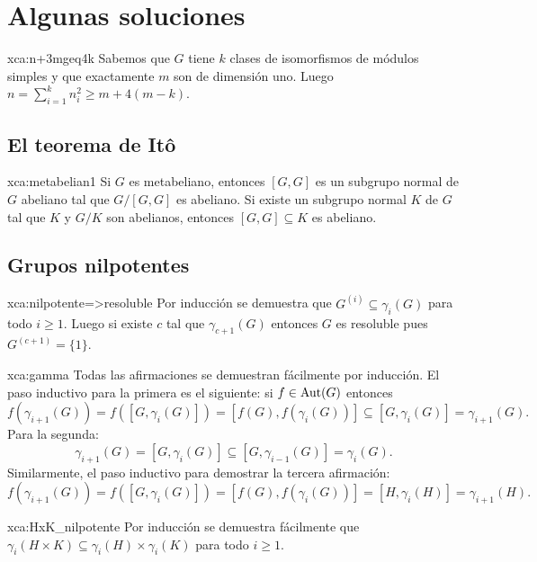 \chapter*{Algunas soluciones}

\begin{sol}{xca:n+3mgeq4k}
     Sabemos que $G$ tiene $k$ clases de isomorfismos de módulos simples y que exactamente 
     $m$ son de dimensión uno. Luego $n=\sum_{i=1}^kn_i^2\geq m+4(m-k)$. 
\end{sol}

\section*{El teorema de It\^o}

\begin{sol}{xca:metabelian1}
	Si $G$ es metabeliano, entonces $[G,G]$ es un subgrupo normal de $G$
	abeliano tal que $G/[G,G]$ es abeliano. Si existe un subgrupo normal $K$ de
	$G$ tal que $K$ y $G/K$ son abelianos, entonces $[G,G]\subseteq K$ es
	abeliano.
\end{sol}

\section*{Grupos nilpotentes}

\begin{sol}{xca:nilpotente=>resoluble}
	Por inducción se demuestra que $G^{(i)}\subseteq\gamma_i(G)$ para todo
	$i\geq1$. Luego si existe $c$ tal que $\gamma_{c+1}(G)$ entonces $G$ es
	resoluble pues $G^{(c+1)}=\{1\}$.
\end{sol}

\begin{sol}{xca:gamma}
	Todas las afirmaciones se demuestran fácilmente por inducción. El paso
	inductivo para la primera es el siguiente: si $f\in\operatorname{Aut}(G)$ entonces
	\[
		f(\gamma_{i+1}(G))
		=f([G,\gamma_i(G)])
		=[f(G),f(\gamma_i(G))]\subseteq [G,\gamma_i(G)]
		=\gamma_{i+1}(G).
	\]
	Para la segunda:
	\[
		\gamma_{i+1}(G)=[G,\gamma_i(G)]\subseteq [G,\gamma_{i-1}(G)]=\gamma_{i}(G).
	\]
	Similarmente, el paso inductivo para demostrar la tercera afirmación:
	\[
		f(\gamma_{i+1}(G))=f([G,\gamma_i(G)])=[f(G),f(\gamma_i(G))]=[H,\gamma_i(H)]=\gamma_{i+1}(H).
	\]
\end{sol}

\begin{sol}{xca:HxK_nilpotente}
	Por inducción se demuestra fácilmente que $\gamma_i(H\times
	K)\subseteq\gamma_i(H)\times\gamma_i(K)$ para todo $i\geq1$. 
\end{sol}

